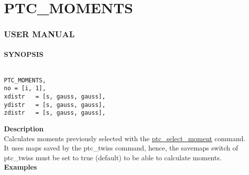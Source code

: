


\section{PTC\_MOMENTS}





\subsubsection{   USER MANUAL   }


\paragraph{SYNOPSIS}
\begin{verbatim}

PTC_MOMENTS, 
no = [i, 1], 
xdistr   = [s, gauss, gauss], 
ydistr   = [s, gauss, gauss], 
zdistr   = [s, gauss, gauss], 

\end{verbatim}


\textbf{ Description }\\

 Calculates moments previously selected with the  \href{PTC_SelectMoment.html}{ptc\_select\_moment} command.  It uses maps saved by the ptc\_twiss command, hence, the savemaps switch of ptc\_twiss must be set to true (default) to be able to calculate moments.  \\

\textbf{ Examples}\\

